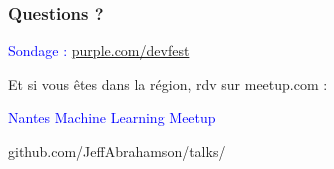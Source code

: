 \documentclass[t]{beamer}
\newcommand\blue[1]{\textcolor{blue}{#1}}
\begin{document}

\begin{frame}
  \frametitle{Questions ?}

  \vspace{1.5cm}
  \centerline{\blue{Sondage : \url{purple.com/devfest}}}

  \vspace{1cm}
  \centerline{Et si vous êtes dans la région, rdv sur meetup.com :}

  \bigskip
  \centerline{\blue{Nantes Machine Learning Meetup}}

  \vspace{2cm}
  \centerline{github.com/JeffAbrahamson/talks/}
\end{frame}
\end{document}
